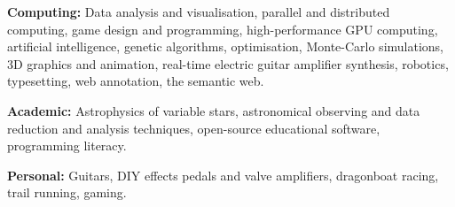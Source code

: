 \documentclass[]{friggeri-cv} %
\begin{document}
\textbf{Computing:} Data analysis and visualisation, parallel and distributed computing, game design and programming, high-performance GPU computing, artificial intelligence, genetic algorithms, optimisation, Monte-Carlo simulations, 3D graphics and animation, real-time electric guitar amplifier synthesis, robotics, typesetting, web annotation, the semantic web.

\textbf{Academic:} Astrophysics of variable stars, astronomical observing and data reduction and analysis techniques, open-source educational software, programming literacy.

\textbf{Personal:} Guitars, DIY effects pedals and valve amplifiers, dragonboat racing, trail running, gaming.



%
\end{document}
